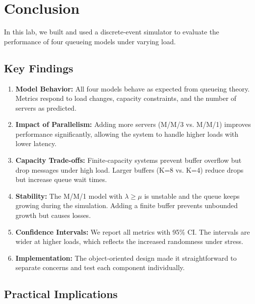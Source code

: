 \documentclass[12pt]{article}
\begin{document}
\section{Conclusion}

In this lab, we built and used a discrete-event simulator to evaluate the performance of four queueing models under varying load.

\subsection{Key Findings}

\begin{enumerate}
    \item \textbf{Model Behavior:} All four models behave as expected from queueing theory. Metrics respond to load changes, capacity constraints, and the number of servers as predicted.

    \item \textbf{Impact of Parallelism:} Adding more servers (M/M/3 vs. M/M/1) improves performance significantly, allowing the system to handle higher loads with lower latency.

    \item \textbf{Capacity Trade-offs:} Finite-capacity systems prevent buffer overflow but drop messages under high load. Larger buffers (K=8 vs. K=4) reduce drops but increase queue wait times.

    \item \textbf{Stability:} The M/M/1 model with $\lambda \ge \mu$ is unstable and the queue keeps growing during the simulation. Adding a finite buffer prevents unbounded growth but causes losses.

    \item \textbf{Confidence Intervals:} We report all metrics with 95\% CI. The intervals are wider at higher loads, which reflects the increased randomness under stress.

    \item \textbf{Implementation:} The object-oriented design made it straightforward to separate concerns and test each component individually.
\end{enumerate}

\subsection{Practical Implications}
\end{document}
